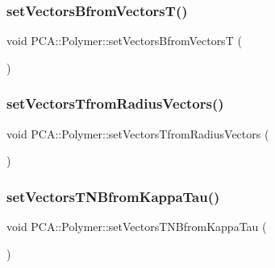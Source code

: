 \hypertarget{class_p_c_a_1_1_polymer_a8dad939cbc8d8df73784526ad4a07aef}{}\label{class_p_c_a_1_1_polymer_a8dad939cbc8d8df73784526ad4a07aef} 
\subsubsection{\texorpdfstring{set\+Vectors\+Bfrom\+Vectors\+T()}{setVectorsBfromVectorsT()}}
{\footnotesize\ttfamily void P\+C\+A\+::\+Polymer\+::set\+Vectors\+Bfrom\+VectorsT (\begin{DoxyParamCaption}{ }\end{DoxyParamCaption})}

\hypertarget{class_p_c_a_1_1_polymer_aa655eb1299b272fef8c91f003abbf50d}{}\label{class_p_c_a_1_1_polymer_aa655eb1299b272fef8c91f003abbf50d} 
\subsubsection{\texorpdfstring{set\+Vectors\+Tfrom\+Radius\+Vectors()}{setVectorsTfromRadiusVectors()}}
{\footnotesize\ttfamily void P\+C\+A\+::\+Polymer\+::set\+Vectors\+Tfrom\+Radius\+Vectors (\begin{DoxyParamCaption}{ }\end{DoxyParamCaption})}

\hypertarget{class_p_c_a_1_1_polymer_a55787461ed50776c48819a5cc3911c38}{}\label{class_p_c_a_1_1_polymer_a55787461ed50776c48819a5cc3911c38} 
\subsubsection{\texorpdfstring{set\+Vectors\+T\+N\+Bfrom\+Kappa\+Tau()}{setVectorsTNBfromKappaTau()}}
{\footnotesize\ttfamily void P\+C\+A\+::\+Polymer\+::set\+Vectors\+T\+N\+Bfrom\+Kappa\+Tau (\begin{DoxyParamCaption}{ }\end{DoxyParamCaption})}



